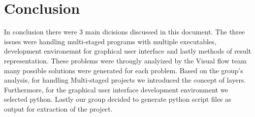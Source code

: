 \documentclass[journal,10pt,onecolumn,compsoc]{IEEEtran} \usepackage[margin=1.0in]{geometry} \usepackage{pdfpages} \usepackage{graphicx}
\begin{document}
\newpage

\section{Conclusion}
In conclusion there were 3 main dicisions discussed in this document. The three issues were handling multi-staged programs with multiple executables,
development environemnt for graphical user interface and lastly methods of result representation.
These problems were througly analyized by the Visual flow team many possible solutions were generated for each problem.
Based on the group's analysis, for handling Multi-staged projects we introduced the concept of layers.
Furthermore, for the graphical user interface development environment we selected python.
Lastly our group decided to generate python script files as output for extraction of the project.
\newpage



\end{document}
